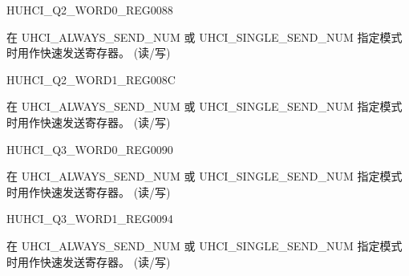 \begin{register}{H}{UHCI\_Q2\_WORD0\_REG}{\hexprefix{}0088}\label{regdesc:UHCIQ2WORD0REG}
%
\regnewline%
\begin{regdesc}\begin{reglist}
\label{fielddesc:UHCISENDQ2WORD0}\item [UHCI\_SEND\_Q2\_WORD0] 在 UHCI\_ALWAYS\_SEND\_NUM 或 UHCI\_SINGLE\_SEND\_NUM 指定模式时用作快速发送寄存器。 (读/写)
\end{reglist}\end{regdesc}
\end{register}


\begin{register}{H}{UHCI\_Q2\_WORD1\_REG}{\hexprefix{}008C}\label{regdesc:UHCIQ2WORD1REG}
%
\regnewline%
\begin{regdesc}\begin{reglist}
\label{fielddesc:UHCISENDQ2WORD1}\item [UHCI\_SEND\_Q2\_WORD1] 在 UHCI\_ALWAYS\_SEND\_NUM 或 UHCI\_SINGLE\_SEND\_NUM 指定模式时用作快速发送寄存器。 (读/写)
\end{reglist}\end{regdesc}
\end{register}


\begin{register}{H}{UHCI\_Q3\_WORD0\_REG}{\hexprefix{}0090}\label{regdesc:UHCIQ3WORD0REG}
%
\regnewline%
\begin{regdesc}\begin{reglist}
\label{fielddesc:UHCISENDQ3WORD0}\item [UHCI\_SEND\_Q3\_WORD0] 在 UHCI\_ALWAYS\_SEND\_NUM 或 UHCI\_SINGLE\_SEND\_NUM 指定模式时用作快速发送寄存器。 (读/写)
\end{reglist}\end{regdesc}
\end{register}


\begin{register}{H}{UHCI\_Q3\_WORD1\_REG}{\hexprefix{}0094}\label{regdesc:UHCIQ3WORD1REG}
%
\regnewline%
\begin{regdesc}\begin{reglist}
\label{fielddesc:UHCISENDQ3WORD1}\item [UHCI\_SEND\_Q3\_WORD1] 在 UHCI\_ALWAYS\_SEND\_NUM 或 UHCI\_SINGLE\_SEND\_NUM 指定模式时用作快速发送寄存器。 (读/写)
\end{reglist}\end{regdesc}
\end{register}


